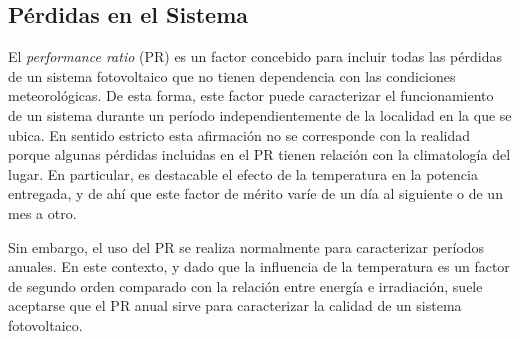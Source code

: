 \subsection{Pérdidas en el Sistema}

El \emph{performance ratio} (PR) es un factor concebido para incluir
todas las pérdidas de un sistema fotovoltaico que no tienen
dependencia con las condiciones meteorológicas. De esta forma, este
factor puede caracterizar el funcionamiento de un sistema durante un período
independientemente de la localidad en la que se ubica. En sentido
estricto esta afirmación no se corresponde con la realidad porque
algunas pérdidas incluidas en el PR tienen relación con la
climatología del lugar. En particular, es destacable el efecto de la
temperatura en la potencia entregada, y de ahí que este factor de
mérito varíe de un día al siguiente o de un mes a otro. 

Sin embargo, el uso del PR se realiza normalmente para caracterizar
períodos anuales. En este contexto, y dado que la influencia de la
temperatura es un factor de segundo orden comparado con la relación entre
energía e irradiación, suele aceptarse que el PR anual sirve para
caracterizar la calidad de un sistema fotovoltaico.  

